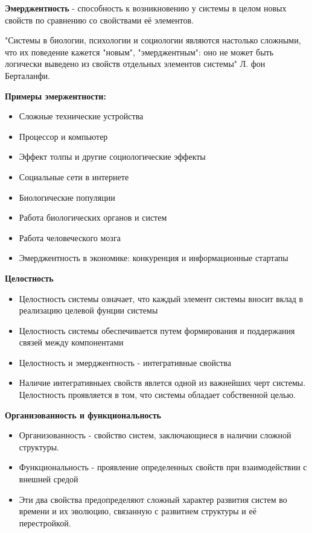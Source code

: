 \documentclass[a4paper]{article}
\begin{document}
	\textbf{Эмерджентность} - способность к возникновению у системы в целом новых свойств по сравнению со свойствами её элементов.
	
	"Системы в биологии, психологии и социологии являются настолько сложными, что их поведение кажется "новым", "эмерджентным": оно не может быть логически выведено из свойств отдельных элементов системы" Л. фон Берталанфи.
	
	\textbf{Примеры эмержентности:}
	\begin{itemize}
		\item Сложные технические устройства
		\item Процессор и компьютер
		\item Эффект толпы и другие социологические эффекты
		\item Социальные сети в интернете
		\item Биологические популяции
		\item Работа биологических органов и систем
		\item Работа человеческого мозга
		\item Эмерджентность в экономике: конкуренция и информационные стартапы
	\end{itemize}

	\textbf{Целостность}
		\begin{itemize}
		\item Целостность системы означает, что каждый элемент системы вносит вклад в реализацию целевой фунции системы
		\item Целостность системы обеспечивается путем формирования и поддержания связей между компонентами
		\item  Целостность и эмерджентность - интегративные свойства
		\item Наличие интегративныех свойств явлется одной из важнейших черт системы. Целостность проявляется в том, что системы обладает собственной целью.
	\end{itemize}

	\textbf{Организованность и функциональность}
	\begin{itemize}
		\item Организованность - свойство систем, заключающиеся в наличии сложной структуры.
		\item Функциональность - проявление определенных свойств при взаимодействии с внешней средой
		\item  Эти два свойства предопределяют сложный характер развития систем во времени и их эволюцию, связанную с развитием структуры и её перестройкой.
	\end{itemize}
\end{document}
